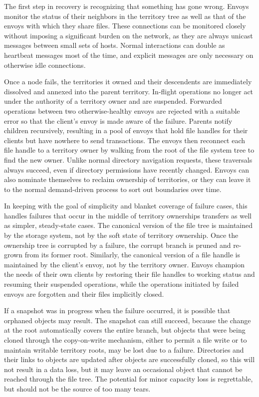 The first step in recovery is recognizing that something has gone wrong. Envoys monitor the status of their neighbors in the territory tree as well as that of the envoys with which they share files. These connections can be monitored closely without imposing a significant burden on the network, as they are always unicast messages between small sets of hosts. Normal interactions can double as heartbeat messages most of the time, and explicit messages are only necessary on otherwise idle connections.

Once a node fails, the territories it owned and their descendents are immediately dissolved and annexed into the parent territory. In-flight operations no longer act under the authority of a territory owner and are suspended. Forwarded operations between two otherwise-healthy envoys are rejected with a suitable error so that the client's envoy is made aware of the failure. Parents notify children recursively, resulting in a pool of envoys that hold file handles for their clients but have nowhere to send transactions. The envoys then reconnect each file handle to a territory owner by walking from the root of the file system tree to find the new owner. Unlike normal directory navigation requests, these traversals always succeed, even if directory permissions have recently changed. Envoys can also nominate themselves to reclaim ownership of territories, or they can leave it to the normal demand-driven process to sort out boundaries over time.

In keeping with the goal of simplicity and blanket coverage of failure cases, this handles failures that occur in the middle of territory ownerships transfers as well as simpler, steady-state cases. The canonical version of the file tree is maintained by the storage system, not by the soft state of territory ownership. Once the ownership tree is corrupted by a failure, the corrupt branch is pruned and re-grown from its former root. Similarly, the canonical version of a file handle is maintained by the client's envoy, not by the territory owner. Envoys champion the needs of their own clients by restoring their file handles to working status and resuming their suspended operations, while the operations initiated by failed envoys are forgotten and their files implicitly closed.

If a snapshot was in progress when the failure occurred, it is possible that orphaned objects may result. The snapshot can still succeed, because the change at the root automatically covers the entire branch, but objects that were being cloned through the copy-on-write mechanism, either to permit a file write or to maintain writable territory roots, may be lost due to a failure. Directories and their links to objects are updated after objects are successfully cloned, so this will not result in a data loss, but it may leave an occasional object that cannot be reached through the file tree. The potential for minor capacity loss is regrettable, but should not be the source of too many tears.

